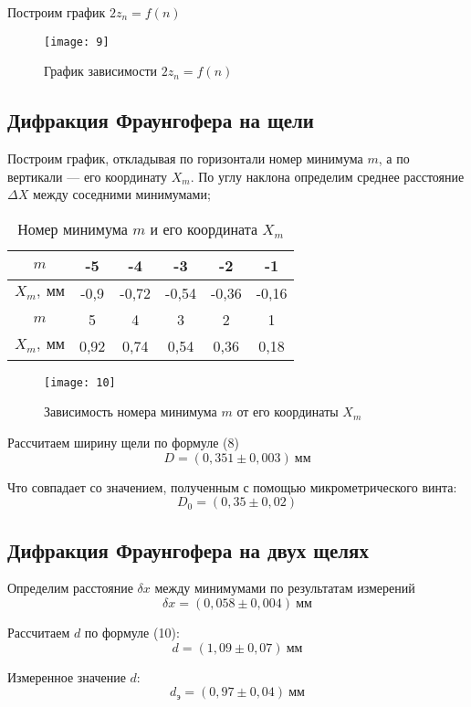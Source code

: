 \documentclass[a4paper, 12pt]{article}
\begin{document}
Построим график $2z_n = f(n)$

\begin{figure}[H]
    \texttt{[image: 9]} 
    \caption{График зависимости $2z_n = f(n)$}
\end{figure}

\subsection*{Дифракция Фраунгофера на щели}

Построим график, откладывая по горизонтали номер минимума $m$, а по
вертикали --- его координату $X_m$. По углу наклона определим среднее
расстояние $\Delta X$ между соседними минимумами; 

\begin{table}[H]
\centering
\begin{tabular}{|c|c|c|c|c|c|}
    \hline 
$m$  & -5   & -4    & -3    & -2    & -1    \\ \hline
$X_m,\ \text{мм}$ & -0,9 & -0,72 & -0,54 & -0,36 & -0,16 \\ \hline
$m$  & 5    & 4     & 3     & 2     & 1     \\ \hline
$X_m,\ \text{мм}$ & 0,92 & 0,74  & 0,54  & 0,36  & 0,18  \\ \hline
\end{tabular}
\caption{Номер минимума $m$ и его координата $X_m$}
\end{table}


\begin{figure}[H]
    \texttt{[image: 10]} 
    \caption{Зависимость номера минимума $m$ от его координаты $X_m$}
\end{figure}

Рассчитаем ширину щели по формуле (8)
\[
    D = (0,351\pm0,003)\ \text{мм}
\]

Что совпадает со значением, полученным с помощью микрометрического
винта:
\[
    D_0 = (0,35 \pm 0,02)
\]


\subsection*{Дифракция Фраунгофера на двух щелях}
Определим расстояние $\delta x$ между минимумами по результатам
измерений 
\[
    \delta x = (0,058 \pm 0,004)\ \text{мм}
\]

Рассчитаем $d$ по формуле (10):
\[
    d = (1,09 \pm 0,07)\ \text{мм} 
\]

Измеренное значение $d$:
\[
    d_\text{э} = (0,97 \pm 0,04)\ \text{мм}
\]
\end{document}
